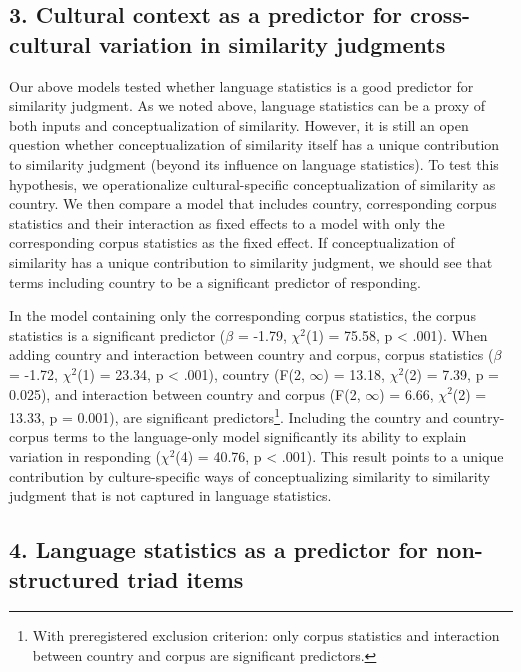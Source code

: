 \documentclass[10pt, letterpaper]{article}
\begin{document}
\hypertarget{cultural-context-as-a-predictor-for-cross-cultural-variation-in-similarity-judgments}{%
\subsection{3. Cultural context as a predictor for cross-cultural
variation in similarity
judgments}\label{cultural-context-as-a-predictor-for-cross-cultural-variation-in-similarity-judgments}}

Our above models tested whether language statistics is a good predictor
for similarity judgment. As we noted above, language statistics can be a
proxy of both inputs and conceptualization of similarity. However, it is
still an open question whether conceptualization of similarity itself
has a unique contribution to similarity judgment (beyond its influence
on language statistics). To test this hypothesis, we operationalize
cultural-specific conceptualization of similarity as country. We then
compare a model that includes country, corresponding corpus statistics
and their interaction as fixed effects to a model with only the
corresponding corpus statistics as the fixed effect. If
conceptualization of similarity has a unique contribution to similarity
judgment, we should see that terms including country to be a significant
predictor of responding.

In the model containing only the corresponding corpus statistics, the
corpus statistics is a significant predictor (\(\beta\) = -1.79,
\(\chi^2\)(1) = 75.58, p \textless{} .001). When adding country and
interaction between country and corpus, corpus statistics (\(\beta\) =
-1.72, \(\chi^2\)(1) = 23.34, p \textless{} .001), country (F(2,
\ensuremath{\infty{}}) = 13.18, \(\chi^2\)(2) = 7.39, p = 0.025), and
interaction between country and corpus (F(2, \ensuremath{\infty{}}) =
6.66, \(\chi^2\)(2) = 13.33, p = 0.001), are significant
predictors\footnote{With preregistered exclusion criterion: only corpus
  statistics and interaction between country and corpus are significant
  predictors.}. Including the country and country-corpus terms to the
language-only model significantly its ability to explain variation in
responding (\(\chi^2\)(4) = 40.76, p \textless{} .001). This result
points to a unique contribution by culture-specific ways of
conceptualizing similarity to similarity judgment that is not captured
in language statistics.

\hypertarget{language-statistics-as-a-predictor-for-non-structured-triad-items}{%
\subsection{4. Language statistics as a predictor for non-structured
triad
items}\label{language-statistics-as-a-predictor-for-non-structured-triad-items}}
\end{document}
